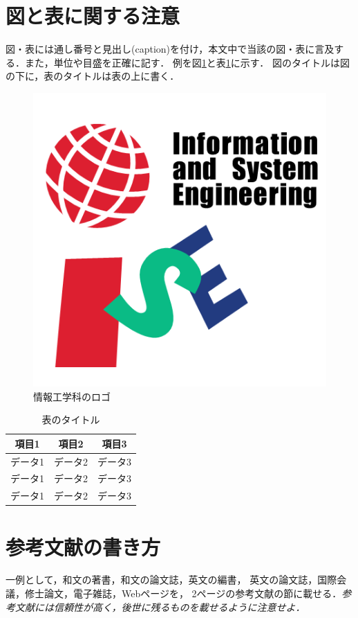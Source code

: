 \documentclass[10pt,a4paper,notitlepage,oneside,twocolumn]{abst_ltjsarticle}
\begin{document}
\section{図と表に関する注意}

図・表には通し番号と見出し(caption)を付け，本文中で当該の図・表に言及する．また，単位や目盛を正確に記す．
例を図\ref{fig:logo}と表\ref{tab:results}に示す．
図のタイトルは図の下に，表のタイトルは表の上に書く．


\begin{figure}[t]
    \centering
    \includegraphics[width=0.52\linewidth]{logo_color.png}
    \caption{情報工学科のロゴ}
    \label{fig:logo}
  \end{figure}

\begin {table}[t]
    \centering
  \caption{表のタイトル}
  \label{tab:results}
  \begin {tabular}{ccc} \hline
     項目1 & 項目2 & 項目3 \\ \hline
    データ1 & データ2 & データ3 \\
    データ1 & データ2 & データ3 \\
    データ1 & データ2 & データ3 \\ \hline
  \end {tabular}
\end {table}

\section{参考文献の書き方}

一例として，和文の著書\cite{suetake}，和文の論文誌\cite{kusano}，英文の編書\cite{fuortes}，
英文の論文誌\cite{rice}，国際会議\cite{guibas}，修士論文\cite{chudai}，電子雑誌\cite{iwama}，Webページ\cite{IPSJ}を，
2ページの参考文献の節に載せる．{\em 参考文献には信頼性が高く，後世に残るものを載せるように注意せよ．}
\end{document}
